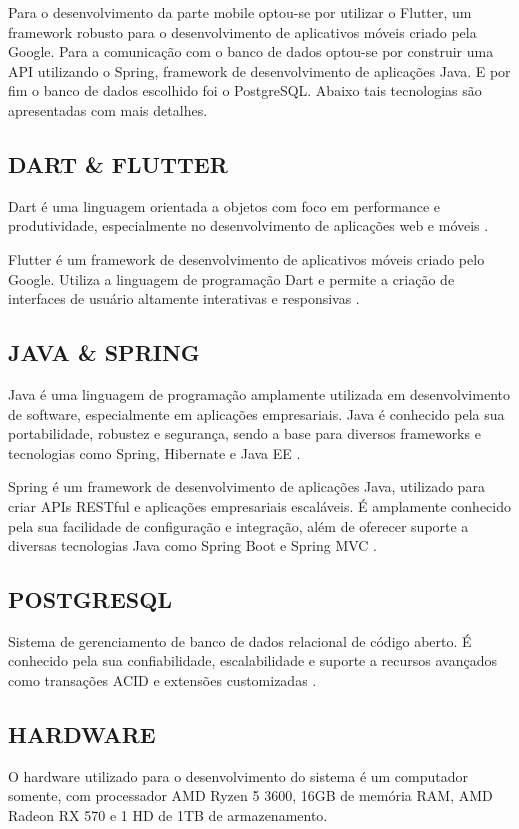 Para o desenvolvimento da parte mobile optou-se por utilizar o Flutter, um framework robusto para o desenvolvimento de aplicativos móveis criado pela Google. Para a comunicação com o banco de dados optou-se por construir uma API utilizando o Spring, framework de desenvolvimento de aplicações Java. E por fim o banco de dados escolhido foi o PostgreSQL. Abaixo tais tecnologias são apresentadas com mais detalhes.

\subsection{DART \& FLUTTER}
Dart é uma linguagem orientada a objetos com foco em performance e produtividade, especialmente no desenvolvimento de aplicações web e móveis \cite{dart}.

Flutter é um framework de desenvolvimento de aplicativos móveis criado pelo Google. Utiliza a linguagem de programação Dart e permite a criação de interfaces de usuário altamente interativas e responsivas \cite{flutter}.

\subsection{JAVA \& SPRING}
Java é uma linguagem de programação amplamente utilizada em desenvolvimento de software, especialmente em aplicações empresariais. Java é conhecido pela sua portabilidade, robustez e segurança, sendo a base para diversos frameworks e tecnologias como Spring, Hibernate e Java EE \cite{java}.

Spring é um framework de desenvolvimento de aplicações Java, utilizado para criar APIs RESTful e aplicações empresariais escaláveis. É amplamente conhecido pela sua facilidade de configuração e integração, além de oferecer suporte a diversas tecnologias Java como Spring Boot e Spring MVC \cite{spring}.

\subsection{POSTGRESQL}
Sistema de gerenciamento de banco de dados relacional de código aberto. É conhecido pela sua confiabilidade, escalabilidade e suporte a recursos avançados como transações ACID e extensões customizadas \cite{postgresql}.

\subsection{HARDWARE}
O hardware utilizado para o desenvolvimento do sistema é um computador somente, com processador AMD Ryzen 5 3600, 16GB de memória RAM, AMD Radeon RX 570 e 1 HD de 1TB de armazenamento.

